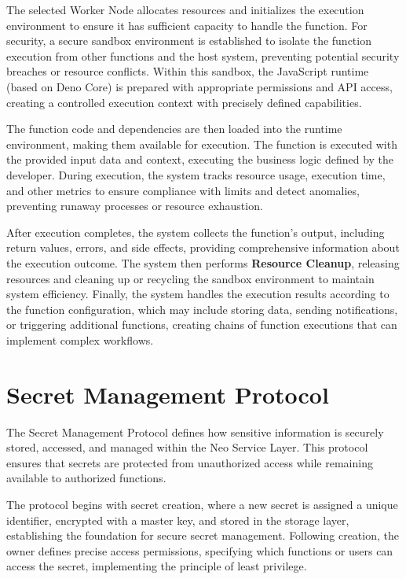 \documentclass[11pt]{article}
\begin{document}
The selected Worker Node allocates resources and initializes the execution environment to ensure it has sufficient capacity to handle the function. For security, a secure sandbox environment is established to isolate the function execution from other functions and the host system, preventing potential security breaches or resource conflicts. Within this sandbox, the JavaScript runtime (based on Deno Core) is prepared with appropriate permissions and API access, creating a controlled execution context with precisely defined capabilities.

The function code and dependencies are then loaded into the runtime environment, making them available for execution. The function is executed with the provided input data and context, executing the business logic defined by the developer. During execution, the system tracks resource usage, execution time, and other metrics to ensure compliance with limits and detect anomalies, preventing runaway processes or resource exhaustion.

After execution completes, the system collects the function's output, including return values, errors, and side effects, providing comprehensive information about the execution outcome. The system then performs \textbf{Resource Cleanup}, releasing resources and cleaning up or recycling the sandbox environment to maintain system efficiency. Finally, the system handles the execution results according to the function configuration, which may include storing data, sending notifications, or triggering additional functions, creating chains of function executions that can implement complex workflows.

\section{Secret Management Protocol}
\label{subsec:secret-protocol-spec}

The Secret Management Protocol defines how sensitive information is securely stored, accessed, and managed within the Neo Service Layer. This protocol ensures that secrets are protected from unauthorized access while remaining available to authorized functions.


The protocol begins with secret creation, where a new secret is assigned a unique identifier, encrypted with a master key, and stored in the storage layer, establishing the foundation for secure secret management. Following creation, the owner defines precise access permissions, specifying which functions or users can access the secret, implementing the principle of least privilege.
\end{document}
